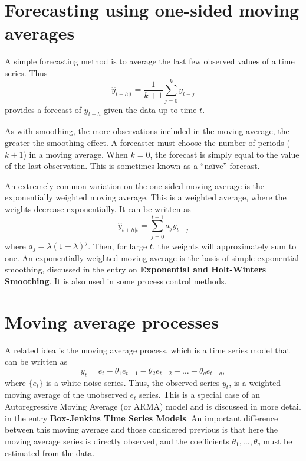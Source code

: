 \documentclass[a4paper,10pt]{article}
\begin{document}
\section{Forecasting using one-sided moving averages}
\label{sec:ma}

A simple forecasting method is to average the last few observed values of a time series. Thus
\[
	\hat{y}_{t+h|t} = \frac{1}{k+1}\sum_{j=0}^{k} y_{t-j}
\]
provides a forecast of $y_{t+h}$ given the data up to time $t$.

As with smoothing, the more observations included in the moving average, the greater the smoothing effect. A forecaster must choose the number of periods ($k+1$) in a moving average. When $k=0$, the forecast is simply equal to the value of the last observation. This is sometimes known as a ``na\"{\i}ve'' forecast.

An extremely common variation on the one-sided moving average is the exponentially weighted moving average. This is a weighted average, where the weights decrease exponentially. It can be written as
\[
	\hat{y}_{t+h|t} = \sum_{j=0}^{t-1} a_jy_{t-j}
\]
where $a_j = \lambda(1-\lambda)^j$. Then, for large $t$, the weights will approximately sum to one. An exponentially weighted moving average is the basis of simple exponential smoothing, discussed in the entry on \textbf{Exponential and Holt-Winters Smoothing}. It is also used in some process control methods.

\section{Moving average processes}

A related idea is the moving average process, which is a time series model that can be written as
\[
	y_t = e_t - \theta_1 e_{t-1} - \theta_2 e_{t-2} - \dots - \theta_q e_{t-q},
\]
where $\{e_t\}$ is a white noise series. Thus, the observed series $y_t$, is a weighted moving average of the unobserved $e_t$ series. This is a special case of an Autoregressive Moving Average (or ARMA) model and is discussed in more detail in the entry \textbf{Box-Jenkins Time Series Models}. An important difference between this moving average and those considered previous is that here the moving average series is directly observed, and the coefficients $\theta_1,\dots,\theta_q$ must be estimated from the data.



\end{document}
